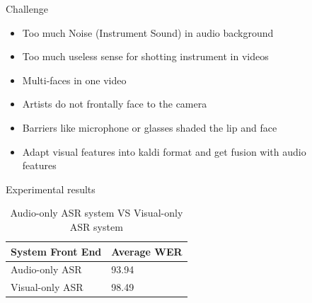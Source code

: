 \documentclass[final]{beamer}
\newlength{\sepwid}
\newlength{\onecolwid}
\newlength{\twocolwid}
\begin{document}
\begin{frame}[t]
\begin{columns}[t]
\begin{column}{\twocolwid}
\end{column} %

\begin{column}{\sepwid}\end{column} %

\begin{column}{\onecolwid} %


\begin{block}{Challenge}
\begin{itemize}
\item Too much Noise (Instrument Sound) in audio background
\item Too much useless sense for shotting instrument in videos
\item Multi-faces in one video
\item Artists do not frontally face to the camera 
\item Barriers like microphone or glasses shaded the lip and face
\item Adapt visual features into kaldi format and get fusion with audio features
\end{itemize}



\end{block}


\begin{block}{Experimental results}

\begin{table}
\vspace{2ex}
\begin{tabular}{l l}
\toprule
\textbf{System Front End    } & \textbf{   Average WER}\\
\midrule
Audio-only ASR    &    93.94\\
Visual-only ASR    &   98.49 \\

\bottomrule
\end{tabular}
\caption{Audio-only ASR system VS Visual-only ASR system}
\end{table}


\end{block}
\end{column}
\end{columns}
\end{frame}
\end{document}
